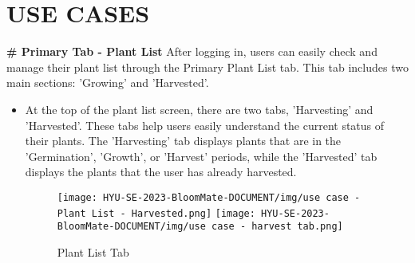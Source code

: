 \documentclass[conference, a4paper]{IEEEtran}
\begin{document}
\section{USE CASES}


\textbf{\# Primary Tab - Plant List}
\newline
After logging in, users can easily check and manage their plant list through the Primary Plant List tab. This tab includes two main sections: 'Growing' and 'Harvested'. 
\begin{itemize}
    \item At the top of the plant list screen, there are two tabs, 'Harvesting' and 'Harvested'. These tabs help users easily understand the current status of their plants. The 'Harvesting' tab displays plants that are in the 'Germination', 'Growth', or 'Harvest' periods, while the 'Harvested' tab displays the plants that the user has already harvested.
    \begin{figure}[h]
    \centerline{
        \texttt{[image: HYU-SE-2023-BloomMate-DOCUMENT/img/use case - Plant List - Harvested.png]}
        \texttt{[image: HYU-SE-2023-BloomMate-DOCUMENT/img/use case - harvest tab.png]}
    }
    \label{fig}
    \caption{Plant List Tab}
    \end{figure}
\end{itemize}
\end{document}
